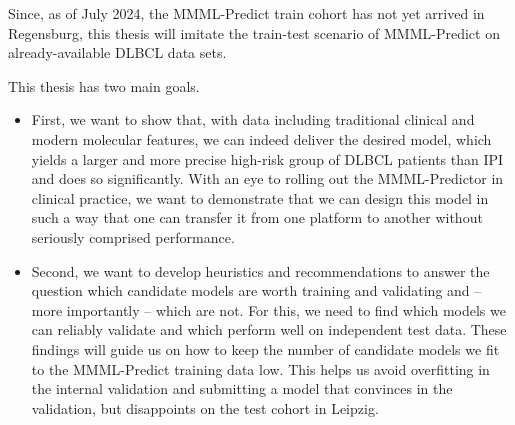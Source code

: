 Since, as of July 2024, the MMML-Predict train cohort has not yet arrived in Regensburg, this thesis
will imitate the train-test scenario of MMML-Predict on already-available DLBCL data sets. 

This thesis has two main goals.
\begin{itemize}
\item First, we want to show that, with data including traditional clinical and modern 
molecular features, we can indeed deliver 
the desired model, which yields a larger and more precise high-risk group of DLBCL patients than 
IPI and does so significantly. With an eye to rolling out the MMML-Predictor in clinical practice, 
we want to demonstrate that we can design this model in such a way that one can transfer it from 
one platform to another without seriously comprised performance.
\item Second, we want to develop heuristics and recommendations to answer the question which candidate 
models are worth training and validating and -- more importantly -- which are not. For this, we 
need to find which models we can reliably validate 
and which perform well on independent test data. These findings will guide us on how to keep 
the number of candidate models we fit to the MMML-Predict training data low. This helps
us avoid overfitting in the internal validation and submitting a model that convinces 
in the validation, but disappoints on the test cohort in Leipzig.
\end{itemize}